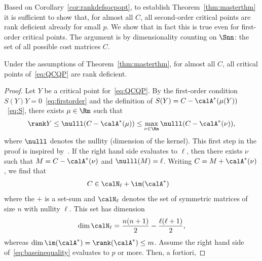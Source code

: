 \documentclass{article}
\newcommand{\1}{\mathbf{1}}
\begin{document}
Based on Corollary~\ref{cor:rankdefsocpopt}, to establish Theorem~\ref{thm:masterthm} it is sufficient to show that, for almost all $C$, all second-order critical points are rank deficient already for small $p$. We show that in fact this is true even for first-order critical points. The argument is by dimensionality counting on $\Snn$: the set of all possible cost matrices $C$.
\begin{lemma} \label{lem:criticalptsrankdeficient}
	Under the assumptions of Theorem~\ref{thm:masterthm}, for almost all $C$, all critical points of~\eqref{eq:QCQP} are rank deficient.
\end{lemma}
\begin{proof}
	Let $Y$ be a critical point for~\eqref{eq:QCQP}. By the first-order condition $S(Y)Y=0$~\eqref{eq:firstorder} and the definition of $S(Y) = C - \calA^*(\mu(Y))$~\eqref{eq:S}, there exists $\mu\in\Rm$ such that
	\begin{align}
	\rank Y \leq \nulll(C-\calA^*(\mu)) \leq \max_{\nu\in\Rm} \nulll(C-\calA^*(\nu)),
	\label{eq:baseinequality}
	\end{align}
	where $\nulll$ denotes the nullity (dimension of the kernel). This first step in the proof is inspired by~\cite[Thm.\,3]{wen2013orthogonality}.
	If the right hand side evaluates to $\ell$, then there exists $\nu$ such that $M = C-\calA^*(\nu)$ and $\nulll(M) = \ell$. Writing $C = M + \calA^*(\nu)$, we find that
	\begin{align}
	C & \in \calN_\ell + \im(\calA^*)
	\end{align}
	where the $+$ is a set-sum and $\calN_\ell$ denotes the set of symmetric matrices of size $n$ with nullity $\ell$. This set has dimension %
	\begin{align}
	\dim \calN_\ell = \frac{n(n+1)}{2} - \frac{\ell(\ell+1)}{2},
	\end{align}
	whereas $\dim \im(\calA^*) = \rank(\calA^*) \leq m$. Assume the right hand side of~\eqref{eq:baseinequality} evaluates to $p$ or more. Then, a fortiori,

\end{proof}
\end{document}
